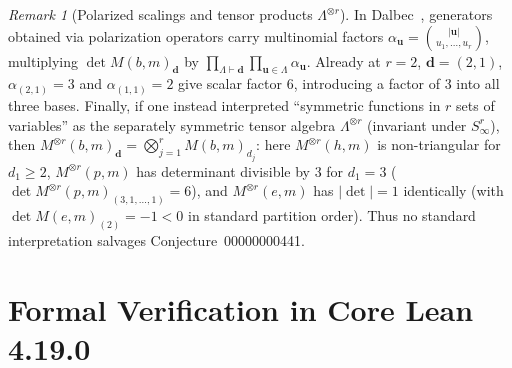 \documentclass[11pt,a4paper]{article}
\theoremstyle{definition}
\theoremstyle{remark}
\newtheorem{remark}[theorem]{Remark}
\newcommand{\vecd}{\mathbf{d}}
\newcommand{\vecu}{\mathbf{u}}
\begin{document}
\begin{remark}[Polarized scalings and tensor products $\Lambda^{\otimes r}$]
In Dalbec~\cite{Dalbec}, generators obtained via polarization operators carry multinomial factors $\alpha_{\vecu} = \binom{|\vecu|}{u_1,\dots,u_r}$, multiplying $\det M(b,m)_{\vecd}$ by $\prod_{\Lambda \vdash \vecd} \prod_{\vecu \in \Lambda} \alpha_{\vecu}$. Already at $r = 2$, $\vecd = (2,1)$, $\alpha_{(2,1)} = 3$ and $\alpha_{(1,1)} = 2$ give scalar factor $6$, introducing a factor of $3$ into all three bases. Finally, if one instead interpreted ``symmetric functions in $r$ sets of variables'' as the separately symmetric tensor algebra $\Lambda^{\otimes r}$ (invariant under $S_\infty^r$), then $M^{\otimes r}(b,m)_{\vecd} = \bigotimes_{j=1}^r M(b,m)_{d_j}$: here $M^{\otimes r}(h,m)$ is non-triangular for $d_1 \ge 2$, $M^{\otimes r}(p,m)$ has determinant divisible by $3$ for $d_1 = 3$ ($\det M^{\otimes r}(p,m)_{(3,1,\dots,1)} = 6$), and $M^{\otimes r}(e,m)$ has $|\det| = 1$ identically (with $\det M(e,m)_{(2)} = -1 < 0$ in standard partition order). Thus no standard interpretation salvages Conjecture~00000000441.
\end{remark}

\section{Formal Verification in Core Lean 4.19.0}
\end{document}
